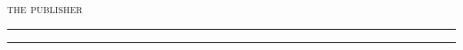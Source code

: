 {\large\textcolor{red}{\plogo}}\\[0.5\baselineskip] %

{\large\textsc{the publisher}} %

\vspace{0.1\textheight} %


\rule{\textwidth}{0.4pt} %

\vspace{2pt}\vspace{-\baselineskip} %

\rule{\textwidth}{1pt} %
